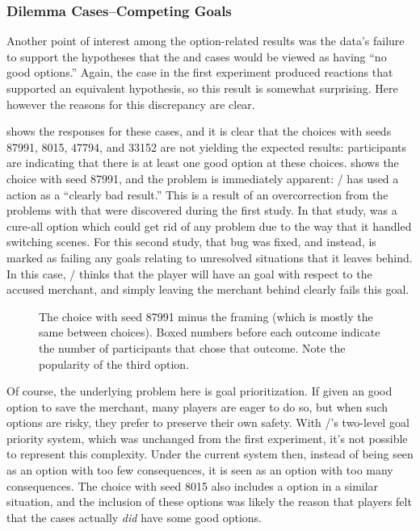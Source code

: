 \subsubsection{Dilemma Cases--Competing Goals}

Another point of interest among the option-related results was the data's failure to support the hypotheses that the \expf{} and \unxs{} cases would be viewed as having ``no good options.''
%
Again, the \dlm{} case in the first experiment produced reactions that supported an equivalent hypothesis, so this result is somewhat surprising.
%
Here however the reasons for this discrepancy are clear.


 shows the responses for these cases, and it is clear that the choices with seeds 87991, 8015, 47794, and 33152 are not yielding the expected results: participants are indicating that there is at least one good option at these choices.
%
 shows the choice with seed 87991, and the problem is immediately apparent: \dunyazad/ has used a  action as a ``clearly bad result.''
%
This is a result of an overcorrection from the problems with  that were discovered during the first study.
%
In that study,  was a cure-all option which could get rid of any problem due to the way that it handled switching scenes.
%
For this second study, that bug was fixed, and instead,  is marked as failing any goals relating to unresolved situations that it leaves behind. 
%
In this case, \dunyazad/ thinks that the  player will have an  goal with respect to the accused merchant, and simply leaving the merchant behind clearly fails this goal.

\begin{figure}[t]
\caption[``Expected failure'' choice 87991]{The choice with seed 87991 minus the framing (which is mostly the same between choices). Boxed numbers before each outcome indicate the number of participants that chose that outcome. Note the popularity of the third option.}
\label{fig:e2-seed-87991}
\end{figure}


Of course, the underlying problem here is goal prioritization.
%
If given an good option to save the merchant, many players are eager to do so, but when such options are risky, they prefer to preserve their own safety.
%
With \dunyazad/'s two-level goal priority system, which was unchanged from the first experiment, it's not possible to represent this complexity.
%
Under the current system then, instead of  being seen as an option with too few consequences, it is seen as an option with too many consequences.
%
The choice with seed 8015 also includes a  option in a similar situation, and the inclusion of these options was likely the reason that players felt that the \expf{} cases actually \emph{did} have some good options.


